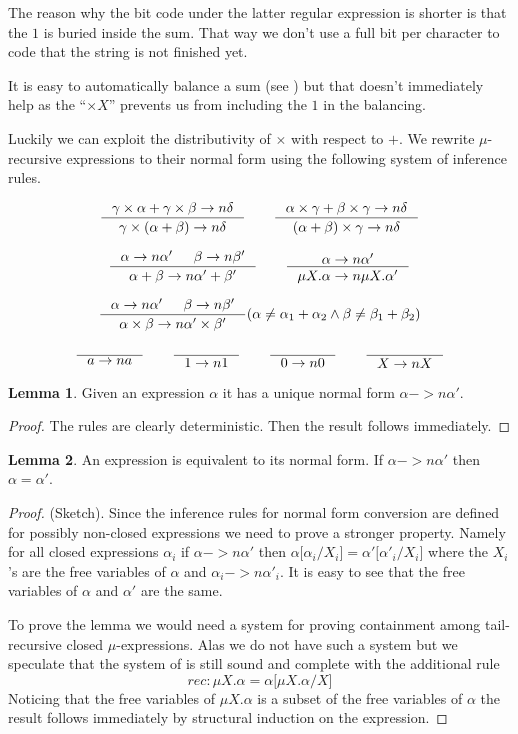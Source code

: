\documentclass[a4paper, oneside]{memoir}
\let\fref\undefined
\theoremstyle{definition}
\newtheorem{lemma}{Lemma}
\begin{document}
The reason why the bit code under the latter regular expression is shorter is
that the $1$ is buried inside the sum. That way we don't use a full bit per
character to code that the string is not finished yet.

It is easy to automatically balance a sum (see \fref{sec:huffman}) but that
doesn't immediately help as the ``$\times X$'' prevents us from including the
$1$ in the balancing.

Luckily we can exploit the distributivity of $\times$ with respect to $+$. We
rewrite $\mu$-recursive expressions to their normal form using the following
system of inference rules.

\[
\inference{\gamma \times \alpha + \gamma \times \beta ->n \delta}{\gamma \times
  (\alpha + \beta) ->n \delta} \qquad
\inference{\alpha \times \gamma + \beta \times \gamma ->n \delta}{(\alpha +
  \beta) \times \gamma ->n \delta}
\]

\[
\inference{\alpha ->n \alpha' & \beta ->n \beta'}{\alpha + \beta ->n \alpha' +
  \beta'} \qquad
\inference{\alpha ->n \alpha'}{\mu X. \alpha ->n \mu X. \alpha'}
\]

\[
\inference{\alpha ->n \alpha' & \beta ->n \beta'}{\alpha \times \beta ->n \alpha'
  \times \beta'}(\alpha \neq \alpha_1 + \alpha_2 \land \beta \neq \beta_1 + \beta_2)
\]

\[
\inference{}{a ->n a} \qquad
\inference{}{1 ->n 1} \qquad
\inference{}{0 ->n 0} \qquad
\inference{}{X ->n X}
\]

\begin{lemma}
  Given an expression $\alpha$ it has a unique normal form $\alpha ->n \alpha'$.
  \begin{proof}
    The rules are clearly deterministic. Then the result follows immediately.
  \end{proof}
\end{lemma}

\begin{lemma}
  An expression is equivalent to its normal form. If $\alpha ->n \alpha'$ then
  $\alpha = \alpha'$.
  \begin{proof} (Sketch).
    Since the inference rules for normal form conversion are defined for
    possibly non-closed expressions we need to prove a stronger property. Namely
    for all closed expressions $\alpha_i$ if $\alpha ->n \alpha'$ then $\alpha
    \lbrack \alpha_i / X_i \rbrack = \alpha' \lbrack \alpha'_i / X_i \rbrack$
    where the $X_i$'s are the free variables of $\alpha$ and $\alpha_i ->n
    \alpha'_i$. It is easy to see that the free variables of $\alpha$ and
    $\alpha'$ are the same.

    To prove the lemma we would need a system for proving containment among
    tail-recursive closed $\mu$-expressions. Alas we do not have such a system
    but we speculate that the system of \cite{heli} is still sound and complete
    with the additional rule
    \[
    rec : \mu X. \alpha = \alpha \lbrack \mu X. \alpha / X \rbrack
    \]
    Noticing that the free variables of $\mu X. \alpha$ is a subset of the free
    variables of $\alpha$ the result follows immediately by structural induction
    on the expression.
  \end{proof}
\end{lemma}
\end{document}

